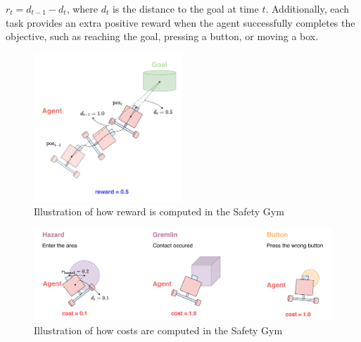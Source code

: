 $ r_t = d_{t - 1} - d_t $, where $d_t$ is the distance to the goal at time $t$.
Additionally, each task provides an extra positive reward when the agent successfully completes the objective, such as reaching the goal, pressing a button, or moving a box.
\begin{figure}[h]
  \centering
  \includegraphics[width=0.5\textwidth]{imgs/chap4/setup/reward.pdf}
  \caption{Illustration of how reward is computed in the Safety Gym}
  \label{chap4:fig:reward}
\end{figure}

\begin{figure}[h]
  \centering
  \includegraphics[width=1.0\textwidth]{imgs/chap4/setup/cost.pdf}
  \caption{Illustration of how costs are computed in the Safety Gym}
  \label{chap4:fig:cost}
\end{figure}

